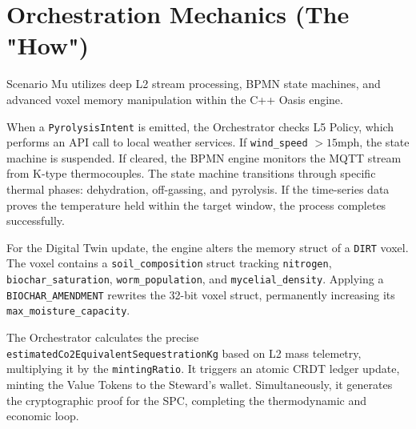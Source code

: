 \section{Orchestration Mechanics (The "How")}
Scenario Mu utilizes deep L2 stream processing, BPMN state machines, and advanced voxel memory manipulation within the C++ Oasis engine.

When a \texttt{PyrolysisIntent} is emitted, the Orchestrator checks L5 Policy, which performs an API call to local weather services. If \texttt{wind\_speed} $> 15\text{mph}$, the state machine is suspended. If cleared, the BPMN engine monitors the MQTT stream from K-type thermocouples. The state machine transitions through specific thermal phases: dehydration, off-gassing, and pyrolysis. If the time-series data proves the temperature held within the target window, the process completes successfully.

For the Digital Twin update, the engine alters the memory struct of a \texttt{DIRT} voxel. The voxel contains a \texttt{soil\_composition} struct tracking \texttt{nitrogen}, \texttt{biochar\_saturation}, \texttt{worm\_population}, and \texttt{mycelial\_density}. Applying a \texttt{BIOCHAR\_AMENDMENT} rewrites the 32-bit voxel struct, permanently increasing its \texttt{max\_moisture\_capacity}. 

The Orchestrator calculates the precise \texttt{estimatedCo2EquivalentSequestrationKg} based on L2 mass telemetry, multiplying it by the \texttt{mintingRatio}. It triggers an atomic CRDT ledger update, minting the Value Tokens to the Steward's wallet. Simultaneously, it generates the cryptographic proof for the SPC, completing the thermodynamic and economic loop.
